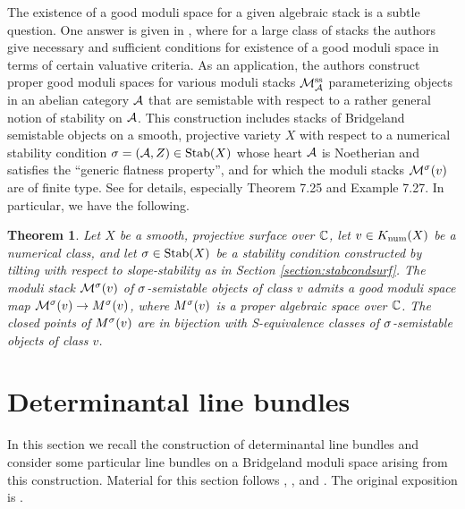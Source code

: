 \documentclass[letterpaper,12pt]{amsart}
\newtheorem{thm}{Theorem}[section]
\theoremstyle{remark}
\begin{document}
The existence of a good moduli space for a given algebraic stack is a subtle question. One answer is given in \cite{AHLH}, where for a large class of stacks the authors give necessary and sufficient conditions for existence of a good moduli space in terms of certain valuative criteria. As an application, the authors construct proper good moduli spaces for various moduli stacks $\mathcal{M}^{\mathrm{ss}}_{\mathcal{A}}$ parameterizing objects in an abelian category $\mathcal{A}$ that are semistable with respect to a rather general notion of stability on $\mathcal{A}$. This construction includes stacks of Bridgeland semistable objects on a smooth, projective variety $X$ with respect to a numerical stability condition $\sigma = (\mathcal{A}, Z) \in \operatorname{\mathrm{Stab}}(X)$ whose heart $\mathcal{A}$ is Noetherian and satisfies the ``generic flatness property'', and for which the moduli stacks $\mathcal{M}^\sigma(v)$ are of finite type. See \cite[Section 7]{AHLH} for details, especially Theorem 7.25 and Example 7.27. In particular, we have the following.
\begin{thm}\label{gmsexists}
    Let $X$ be a smooth, projective surface over $\mathbb{C}$, let $v \in K_{\mathrm{num}}(X)$ be a numerical class, and let $\sigma \in \operatorname{\mathrm{Stab}}(X)$ be a stability condition constructed by tilting with respect to slope-stability as in Section \ref{section:stabcondsurf}. The moduli stack $\mathcal{M}^\sigma(v)$ of $\sigma$-semistable objects of class $v$ admits a good moduli space map $\mathcal{M}^\sigma(v) \to M^\sigma(v)$, where $M^\sigma(v)$ is a proper algebraic space over $\mathbb{C}$. The closed points of $M^\sigma(v)$ are in bijection with S-equivalence classes of $\sigma$-semistable objects of class $v$.
\end{thm}



\section{Determinantal line bundles}
In this section we recall the construction of determinantal line bundles and consider some particular line bundles on a Bridgeland moduli space arising from this construction. Material for this section follows \cite[\href{https://stacks.math.columbia.edu/tag/0FJI}{Tag 0FJI}]{stacks-project}, \cite[\href{https://stacks.math.columbia.edu/tag/0FJW}{Tag 0FJW}]{stacks-project}, and \cite[Section 8.1]{HL}. The original exposition is \cite{KM76}.
\end{document}
